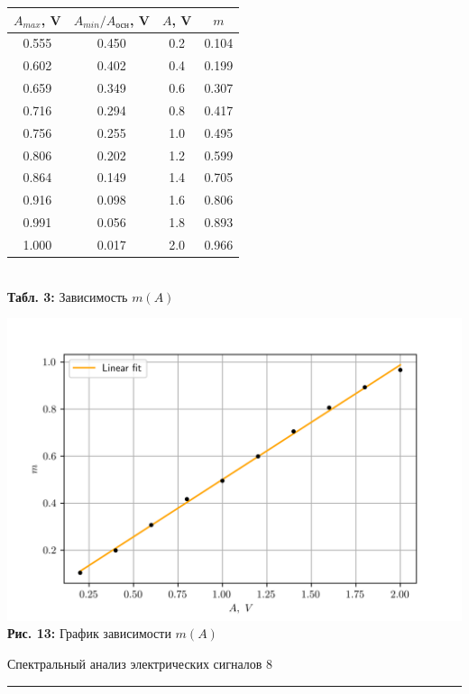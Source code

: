 \documentclass[12pt,a4paper]{scrartcl}
\begin{document}
	\begin{center}
		\begin{tabular}{|c|c|c|c|}
			\hline
			$A_{max}$, V & $A_{min} / A_{\text{осн}}$, V & $A$, V & $m$
			\\\hline
			0.555 & 0.450 & 0.2 & 0.104
			\\\hline
			0.602 & 0.402 & 0.4 & 0.199
			\\\hline
			0.659 & 0.349 & 0.6 & 0.307
			\\\hline
			0.716 & 0.294 & 0.8 & 0.417
			\\\hline
			0.756 & 0.255 & 1.0 & 0.495
			\\\hline
			0.806 & 0.202 & 1.2 & 0.599
			\\\hline
			0.864 & 0.149 & 1.4 & 0.705
			\\\hline
			0.916 & 0.098 & 1.6 & 0.806
			\\\hline
			0.991 & 0.056 & 1.8 & 0.893
			\\\hline
			1.000 & 0.017 & 2.0 & 0.966
			\\\hline
		\end{tabular}
		\\\textbf{Табл. 3:} Зависимость $m(A)$
	\end{center}

	\begin{center}
		\includegraphics[scale=1]{PIC_13.png}
		\\\textbf{Рис. 13:} График зависимости $m(A)$
	\end{center}
	
	
	\newpage
	
	
	\begin{flushleft}
		\footnotesize{Спектральный анализ электрических сигналов} \hspace{\fill} \footnotesize{8}
		\\[-0.3cm]\noindent\rule{\textwidth}{0.3pt}
	\end{flushleft}
	
\end{document}
